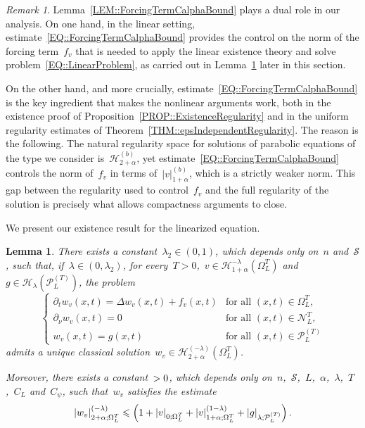 \documentclass[12pt,a4paper]{amsart}
\makeatletter
\numberwithin{equation}{section}
\newtheorem{lemma}[theorem]{Lemma}
\theoremstyle{definition}
\theoremstyle{remark}
\newtheorem{remark}[theorem]{Remark}
\newcommand{\abs}[1]{\left\lvert#1\right\rvert}
\renewcommand{\leq}{\leqslant}
\newcommand{\const}[1]{%
  \csname const@#1\endcsname%
}
\makeatother
\begin{document}
\begin{remark}\label{REM::ForcingTermRegularity}
Lemma~\ref{LEM::ForcingTermCalphaBound} plays a dual role in our analysis. On one hand, in the linear setting, estimate~\eqref{EQ::ForcingTermCalphaBound} provides the control on the norm of the forcing term~$f_v$ that is needed to apply the linear existence theory and solve problem~\eqref{EQ::LinearProblem}, as carried out in Lemma~\ref{LEM::LinearSolution} later in this section.

On the other hand, and more crucially, estimate~\eqref{EQ::ForcingTermCalphaBound} is the key ingredient that makes the nonlinear arguments work, both in the existence proof of Proposition~\ref{PROP::ExistenceRegularity} and in the uniform regularity estimates of Theorem~\ref{THM::epsIndependentRegularity}. The reason is the following. The natural regularity space for solutions of parabolic equations of the type we consider is~$\mathcal{H}_{2+\alpha}^{(b)}$, yet estimate~\eqref{EQ::ForcingTermCalphaBound} controls the norm of~$f_v$ in terms of~$\abs{v}_{1+\alpha}^{(b)}$, which is a strictly weaker norm. This gap between the regularity used to control~$f_v$ and the full regularity of the solution is precisely what allows compactness arguments to close.
\end{remark}

We present our existence result for the linearized equation.

\begin{lemma}\label{LEM::LinearSolution}
    There exists a constant~$\lambda_2 \in (0,1)$, which depends only on~$n$ and~$\mathcal{S}$, such that, if~$\lambda \in (0,\lambda_2)$, for every~$T>0$,~$v \in \mathcal{H}_{1+\alpha}^{-\lambda}(\Omega_L^T)$ and~$g \in \mathcal{H}_\lambda\left(\mathcal{P}_L^{(T)}\right)$, the problem
    \begin{equation}\label{EQ::LinearProblem}
        \begin{cases}
            \partial_{t} w_v(x,t) = \Delta w_v(x,t) + f_v(x,t)&\text{for all }(x,t) \in \Omega_L^T,\\
            \partial_{\nu} w_v(x,t) = 0&\text{for all }(x,t) \in \mathcal{N}_L^T,\\
            w_v(x,t) = g(x,t)&\text{for all }(x,t) \in \mathcal{P}_L^{(T)}
        \end{cases}
    \end{equation}
    admits a unique classical solution~$w_v \in \mathcal{H}_{2+\alpha}^{(-\lambda)}(\Omega_L^T)$.
    
    Moreover, there exists a constant~$\const{CONST::LinearSchauder} > 0$, which depends only on~$n$,~$\mathcal{S}$,~$L$,~$\alpha$,~$\lambda$,~$T$,~$C_L$ and~$C_\psi$, such that~$w_v$ satisfies the estimate
    \begin{equation}\label{EQ::LinearSchauder}
        \abs{w_v}_{2+\alpha;\Omega_L^T}^{(-\lambda)} \leq \const{CONST::LinearSchauder} \left(1+\abs{v}_{0; \Omega_L^T} + \abs{v}_{1+\alpha; \Omega_L^T}^{(1-\lambda)} + \abs{g}_{\lambda; \mathcal{P}_L^{(T)}}\right).
    \end{equation}
\end{lemma}
\end{document}
